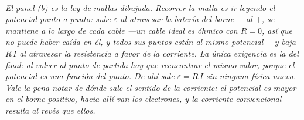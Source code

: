 \begin{center}
\\[0.5em]
{\small\itshape El panel (b) es la ley de mallas dibujada. Recorrer la malla es
ir leyendo el potencial punto a punto: sube $\varepsilon$ al atravesar la
batería del borne $-$ al $+$, se mantiene a lo largo de cada cable ---un cable
ideal es óhmico con $R=0$, así que no puede haber caída en él, y todos sus
puntos están al mismo potencial--- y baja $R\,I$ al atravesar la resistencia a
favor de la corriente. La única exigencia es la del final: al volver al punto de
partida hay que reencontrar el mismo valor, porque el potencial es una función
del punto. De ahí sale $\varepsilon = R\,I$ sin ninguna física nueva. Vale la
pena notar de dónde sale el sentido de la corriente: el potencial es mayor en el
borne positivo, hacia allí van los electrones, y la corriente convencional
resulta al revés que ellos.}
\end{center}
